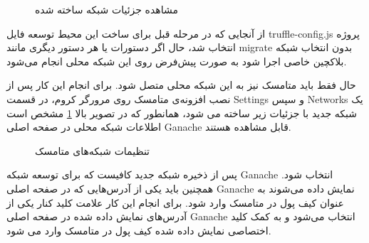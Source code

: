 \begin{figure}[ht]
\centerline{}
\caption{مشاهده جزئیات شبکه ساخته شده}
\label{fig:ganache-3}
\end{figure}

از آنجایی که در مرحله قبل برای ساخت این محیط توسعه فایل truffle-config.js پروژه انتخاب شد، حال اگر دستورات
یا هر دستور دیگری مانند migrate بدون انتخاب شبکه بلاکچین خاصی اجرا شود به صورت پیش‌فرض روی این شبکه محلی انجام می‌شود.

حال فقط باید متامسک نیز به این شبکه محلی متصل شود. برای انجام این کار پس از نصب افزونه‌ی متامسک روی مرورگر کروم، در قسمت
\gls{Settings}
و سپس
\glspl{Network}
یک شبکه جدید با جزئیات زیر ساخته می شود، همانطور که در تصویر بالا
\ref{fig:ganache-3}
مشخص است اطلاعات شبکه محلی در صفحه اصلی Ganache قابل مشاهده هستند.

\begin{figure}[ht]
\centerline{}
\caption{تنظیمات شبکه‌های متامسک}
\label{fig:metamask-network}
\end{figure}

پس از ذخیره شبکه جدید کافیست که برای توسعه شبکه Ganache انتخاب شود. همچنین باید یکی از آدرس‌هایی که در صفحه اصلی Ganache نمایش داده می‌شوند به عنوان کیف پول در متامسک وارد شود. برای انجام این کار علامت کلید کنار یکی از آدرس‌های نمایش داده شده در صفحه اصلی Ganache انتخاب می‌شود و به کمک کلید اختصاصی نمایش داده شده کیف پول در متامسک وارد می شود.

